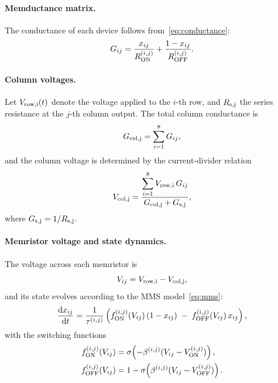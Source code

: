 \documentclass[11pt, oneside]{article}
\begin{document}
\paragraph{Memductance matrix.}

The conductance of each device follows from~\eqref{eq:conductance}:
\begin{equation}
  G_{ij} = \frac{x_{ij}}{R_{\rm ON}^{(i,j)}} + \frac{1 - x_{ij}}{R_{\rm OFF}^{(i,j)}}.
  \label{eq:G_matrix}
\end{equation}


\paragraph{Column voltages.}
Let \(V_{\rm row,i}(t)\) denote the voltage applied to the \(i\)-th row, and \(R_{\rm s,j}\) the series resistance at the \(j\)-th column output. The total column conductance is
\begin{equation}
  G_{\rm col,j} = \sum_{i=1}^{8} G_{ij},
  \label{eq:G_col}
\end{equation}
and the column voltage is determined by the current-divider relation
\begin{equation}
  V_{\rm col,j} = \frac{\displaystyle\sum_{i=1}^{8} V_{\rm row,i}\, G_{ij}}{G_{\rm col,j} + G_{\rm s,j}},
  \label{eq:V_col}
\end{equation}
where \(G_{\rm s,j} = 1/R_{\rm s,j}\).

\paragraph{Memristor voltage and state dynamics.}
The voltage across each memristor is
\begin{equation}
  V_{ij} = V_{\rm row,i} - V_{\rm col,j},
  \label{eq:V_mem}
\end{equation}
and its state evolves according to the MMS model~\eqref{eq:mms}:
\begin{equation}
  \frac{{\rm d} {x_{ij}}}{{\rm d} t} = \frac{1}{\tau^{(i,j)}} \left( f_{\rm ON}^{(i,j)}(V_{ij})\,(1 - x_{ij}) \;-\; f_{\rm OFF}^{(i,j)}(V_{ij})\, x_{ij} \right),
  \label{eq:crossbar_dynamics}
\end{equation}
with the switching functions
\begin{align}
  f_{\rm ON}^{(i,j)}(V_{ij})  &= \sigma\!\left(-\beta^{(i,j)} (V_{ij} - V_{\rm ON}^{(i,j)})\right), \\
  f_{\rm OFF}^{(i,j)}(V_{ij}) &= 1 - \sigma\!\left(\beta^{(i,j)} (V_{ij} - V_{\rm OFF}^{(i,j)})\right).
\end{align}
\end{document}

